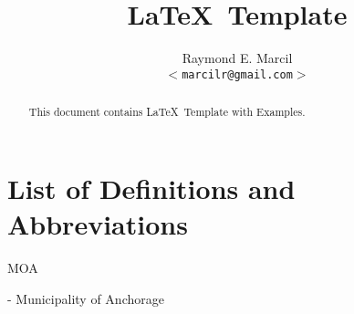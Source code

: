 \documentclass[12pt,letterpaper,dvips]{article}
\title{\LaTeX\ Template}
\author{Raymond E. Marcil\\
        \texttt{$<$marcilr@gmail.com$>$}
}
\newenvironment{itemize*}%
  {\begin{itemize}%
    \setlength{\itemsep}{0pt}%
    \setlength{\parsep}{0pt}}%
  {\end{itemize}}
\begin{document}
\maketitle

\begin{abstract}
     This document contains \LaTeX\ Template with Examples.

\end{abstract}

\vspace{2.0in}


\newpage
\tableofcontents

\newpage
\listoffigures
\listoftables


\newpage
\setcounter{secnumdepth}{0}
\section{List of Definitions and Abbreviations}
\begin{itemize*}
  \item{\begin{bf}MOA\end{bf}} - Municipality of Anchorage

\end{itemize*}


\newpage
\end{document}
